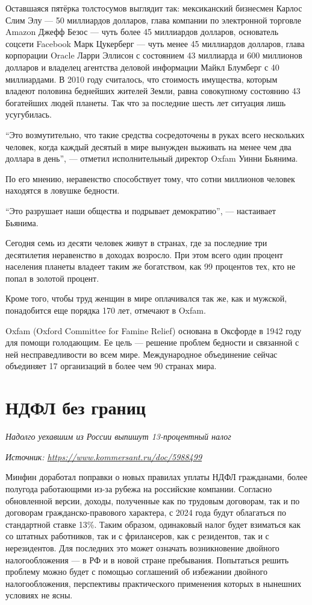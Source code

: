 Оставшаяся пятёрка толстосумов выглядит так: мексиканский бизнесмен Карлос Слим Элу --- 50 миллиардов долларов, глава компании по электронной торговле Amazon Джефф Безос --- чуть более 45 миллиардов долларов, основатель соцсети Facebook Марк Цукерберг --- чуть менее 45 миллиардов долларов, глава корпорации Oracle Ларри Эллисон с состоянием 43 миллиарда и 600 миллионов долларов и владелец агентства деловой информации Майкл Блумберг с 40 миллиардами.
В 2010 году считалось, что стоимость имущества, которым владеют половина беднейших жителей Земли, равна совокупному состоянию 43 богатейших людей планеты. Так что за последние шесть лет ситуация лишь усугубилась.

``Это возмутительно, что такие средства сосредоточены в руках всего нескольких человек, когда каждый десятый в мире вынужден выживать на менее чем два доллара в день'', --- отметил исполнительный директор Oxfam Уинни Бьянима.

По его мнению, неравенство способствует тому, что сотни миллионов человек находятся в ловушке бедности.

``Это разрушает наши общества и подрывает демократию'', --- настаивает Бьянима.

Сегодня семь из десяти человек живут в странах, где за последние три десятилетия неравенство в доходах возросло. При этом всего один процент населения планеты владеет таким же богатством, как 99 процентов тех, кто не попал в золотой процент.

Кроме того, чтобы труд женщин в мире оплачивался так же, как и мужской, понадобится еще порядка 170 лет, отмечают в Oxfam.

Oxfam (Oxford Committee for Famine Relief) основана в Оксфорде в 1942 году для помощи голодающим. Ее цель --- решение проблем бедности и связанной с ней несправедливости во всем мире. Международное объединение сейчас объединяет 17 организаций в более чем 90 странах мира.

\newpage
\section{НДФЛ без границ}
\textit{Надолго уехавшим из России выпишут 13-процентный налог}

{\it Источник: \url{https://www.kommersant.ru/doc/5988499}}

Минфин доработал поправки о новых правилах уплаты НДФЛ гражданами, более полугода работающими из-за рубежа на российские компании. Согласно обновленной версии, доходы, полученные как по трудовым договорам, так и по договорам гражданско-правового характера, с 2024 года будут облагаться по стандартной ставке 13\%. Таким образом, одинаковый налог будет взиматься как со штатных работников, так и с фрилансеров, как с резидентов, так и с нерезидентов. Для последних это может означать возникновение двойного налогообложения — в РФ и в новой стране пребывания. Попытаться решить проблему можно будет с помощью соглашений об избежании двойного налогообложения, перспективы практического применения которых в нынешних условиях не ясны.

